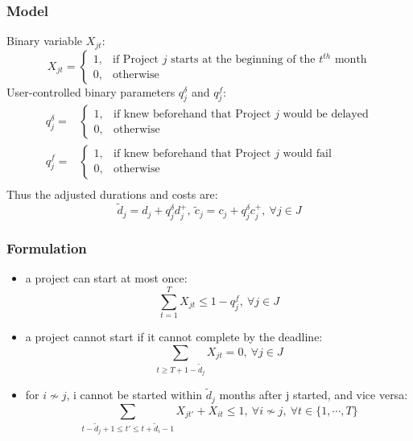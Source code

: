 \documentclass{beamer}
\begin{document}
		\begin{frame}
			\frametitle{Model}
			Binary variable $X_{jt}$:
			\begin{equation*}
				X_{jt}=
				\begin{cases}
					1, & \text{if Project } j \text{ starts at the beginning of the } t^{th} \text{ month} \\
					0, & \text{otherwise}
				\end{cases}
			\end{equation*}
			User-controlled binary parameters $q^{\delta}_j$ and $q^f_j$:
			\begin{equation*}
				\begin{array}{cl}
					q^{\delta}_j= &
					\begin{cases}
						1, & \text{if knew beforehand that Project } j \text{ would be delayed} \\
						0, & \text{otherwise}
					\end{cases}\\
					q^{f}_j= &
					\begin{cases}
						1, & \text{if knew beforehand that Project } j \text{ would fail} \\
						0, & \text{otherwise}
					\end{cases}\\
				\end{array}
			\end{equation*}
			Thus the adjusted durations and costs are:
			\begin{equation*}
				\tilde{d}_j=d_j+q^{\delta}_j d^+_j
				,~
				\tilde{c}_j=c_j+q^{\delta}_j c^+_j
				,~\forall j \in J
			\end{equation*}
		\end{frame}
		
		\begin{frame}
			\frametitle{Formulation}
			\begin{itemize}
				\item a project can start at most once:
					\begin{equation*}
						\sum\limits_{t=1}^{T} X_{jt} \leq 1-q^f_j,~\forall j \in J
					\end{equation*}
				\item a project cannot start if it cannot complete by the deadline:
					\begin{equation*}
						\sum\limits_{t\geq T+1-\tilde{d}_j} X_{jt}=0,~\forall j \in J
					\end{equation*}
				\item for $i \nsim j$, i cannot be started within $\tilde{d}_j$ months after j started, and vice versa:
					\begin{equation*}
						\sum\limits_{t-\tilde{d}_j+1\leq t'\leq t+\tilde{d}_i-1} X_{jt'} + X_{it} \leq 1,~\forall i \nsim j,~\forall t \in \{1,\cdots,T\}
					\end{equation*}
			\end{itemize}
		\end{frame}
		
\end{document}
